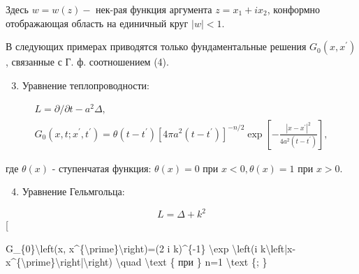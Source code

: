 \documentclass[10pt]{article}
\begin{document}
Здесь $w=w(z)-$ нек-рая функция аргумента $z=x_{1}+i x_{2}$, конформно отображающая область на единичный круг $|w|<1$.



В следующих примерах приводятся только фундаментальные решения $G_{0}\left(x, x^{\prime}\right)$, связанные с Г. ф. соотношением (4).



\begin{enumerate}

  \setcounter{enumi}{2}

  \item Уравнение теплопроводности:

\end{enumerate}



\[

\begin{gathered}

L=\partial / \partial t-a^{2} \Delta, \\

G_{0}\left(x, t ; x^{\prime}, t^{\prime}\right)=\theta\left(t-t^{\prime}\right)\left[4 \pi a^{2}\left(t-t^{\prime}\right)\right]^{-n / 2} \exp \left[-\frac{\left|x-x^{\prime}\right|^{2}}{4 a^{2}\left(t-t^{\prime}\right)}\right],

\end{gathered}

\]



где $\theta(x)$ - ступенчатая функция: $\theta(x)=0$ при $x<0, \theta(x)=1$ при $x>0$.



\begin{enumerate}

  \setcounter{enumi}{3}

  \item Уравнение Гельмгольца:

\end{enumerate}



\[

L=\Delta+k^{2}

\][



G\_\{0\}\textbackslash left(x, x\^{}\{\textbackslash prime\}\textbackslash right)=(2 i k)\^{}\{-1\} \textbackslash exp \textbackslash left(i k\textbackslash left|x-x\^{}\{\textbackslash prime\}\textbackslash right|\textbackslash right) \textbackslash quad \textbackslash text \{ при \} n=1 \textbackslash text \{; \}
\end{document}
